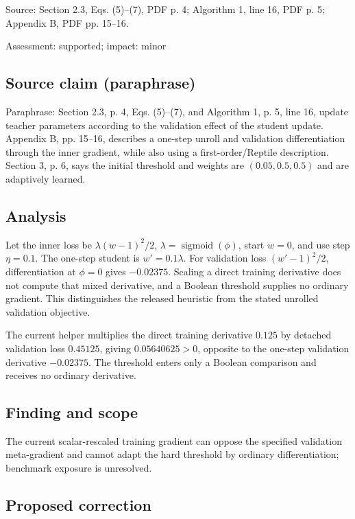 \documentclass[11pt]{article}
\begin{document}
Source: Section 2.3, Eqs. (5)–(7), PDF p. 4; Algorithm 1, line 16, PDF p. 5; Appendix B, PDF pp. 15–16.

Assessment: supported; impact: minor

\subsection*{Source claim (paraphrase)}

Paraphrase: Section 2.3, p. 4, Eqs. (5)–(7), and Algorithm 1, p. 5, line 16, update teacher parameters according to the validation effect of the student update. Appendix B, pp. 15–16, describes a one-step unroll and validation differentiation through the inner gradient, while also using a first-order/Reptile description. Section 3, p. 6, says the initial threshold and weights are \((0.05,0.5,0.5)\) and are adaptively learned.

\subsection*{Analysis}

Let the inner loss be \(\lambda(w-1)^2/2\), \(\lambda=\operatorname{sigmoid}(\phi)\), start \(w=0\), and use step \(\eta=0.1\). The one-step student is \(w'=0.1\lambda\). For validation loss \((w'-1)^2/2\), differentiation at \(\phi=0\) gives \(-0.02375\). Scaling a direct training derivative does not compute that mixed derivative, and a Boolean threshold supplies no ordinary gradient. This distinguishes the released heuristic from the stated unrolled validation objective.

The current helper multiplies the direct training derivative \(0.125\) by detached validation loss \(0.45125\), giving \(0.05640625>0\), opposite to the one-step validation derivative \(-0.02375\). The threshold enters only a Boolean comparison and receives no ordinary derivative.

\subsection*{Finding and scope}

The current scalar-rescaled training gradient can oppose the specified validation meta-gradient and cannot adapt the hard threshold by ordinary differentiation; benchmark exposure is unresolved.

\subsection*{Proposed correction}
\end{document}
